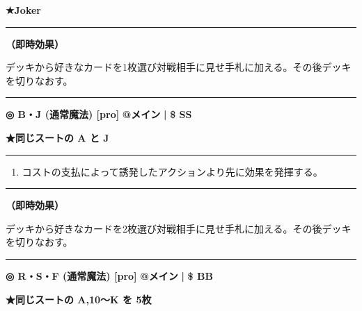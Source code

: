 \documentclass[twocolumn,a5paper,papersize,10pt]{jarticle}
\begin{document}
{\footnotesize\bf ★Joker}

\vspace{1mm}%
\hrule height 0.1mm depth 0mm width 66.5mm %
\vspace{1mm}%

{\bf（即時効果）}

デッキから好きなカードを1枚選び対戦相手に見せ手札に加える。その後デッキを切りなおす。
\vspace{2mm} %
\hrule height 0.5mm depth 0mm width 66.5mm %
\vspace{1mm} %
{\small\bf ◎ B・J {\scriptsize (通常魔法) [pro]}} %
\hfill 
{\footnotesize\bf @メイン }
  {\footnotesize\bf | } {\footnotesize\bf \$ SS}

{\footnotesize\bf ★同じスートの A と J}

\vspace{1mm}%
\hrule height 0.1mm depth 0mm width 66.5mm %
\vspace{1mm}%


\vspace{-1zh}%
\begin{enumerate}
\renewcommand{\labelenumi}{※}
\setlength{\leftskip}{-0.3cm}
\setlength{\itemsep}{0pt} %
\setlength{\parskip}{0pt} %

\item コストの支払によって誘発したアクションより先に効果を発揮する。

\vspace{-3mm}%
\end{enumerate}
\vspace{1mm}%
\hrule height 0.1mm depth 0mm width 66.5mm %
\vspace{1mm}%

{\bf（即時効果）}

デッキから好きなカードを2枚選び対戦相手に見せ手札に加える。その後デッキを切りなおす。
\vspace{2mm} %
\hrule height 0.5mm depth 0mm width 66.5mm %
\vspace{1mm} %
{\small\bf ◎ R・S・F {\scriptsize (通常魔法) [pro]}} %
\hfill 
{\footnotesize\bf @メイン }
  {\footnotesize\bf | } {\footnotesize\bf \$ BB}

{\footnotesize\bf ★同じスートの A,10〜K を 5枚}
\end{document}
